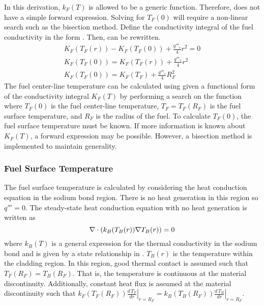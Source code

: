       In this derivation, $k_F(T)$ is allowed to be a generic function. 
      Therefore,  does not have a simple forward 
      expression. Solving for $T_F(0)$ will require a non-linear search such as
      the bisection method. Define the conductivity integral of the fuel
      conductivity in the form .
      Then,  can be rewritten.
      \begin{gather}
        K_F(T_F(r)) - K_F(T_F(0)) + \frac{q'''_c}{4} r^2 = 0 \\
        K_F(T_F(0)) = K_F(T_F(r)) + \frac{q'''_c}{4} r^2 \\
        \label{eq:tcl_conductivity_integral}
        K_F(T_F(0)) = K_F(T_F) + \frac{q'''_c}{4} R_F^2
      \end{gather}
      The fuel center-line temperature can be calculated using
       given a functional form of the
      conductivity integral $K_F(T)$ by performing a search on the function
      where $T_F(0)$ is the fuel center-line temperature, $T_F=T_F(R_F)$ is the
      fuel surface temperature, and $R_F$ is the radius of the fuel. To
      calculate $T_F(0)$, the fuel surface temperature must be known.
      If more information is known about $K_F(T)$, a forward expression
      may be possible. However, a bisection method is implemented to maintain
      generality.

    \subsubsection{Fuel Surface Temperature}
      The fuel surface temperature is calculated by considering the heat
      conduction equation in the sodium bond region. There is no heat generation
      in this region so $q'''=0$.
      The steady-state heat conduction equation with no heat generation is
      written as
      \begin{equation}
        \label{eq:tc_grad}
        \mathbf{\nabla} \cdot (k_B(T_B(r)) \mathbf{\nabla} T_B(r)) = 0
      \end{equation}
      where $k_B(T)$ is a general expression for the thermal conductivity in the
      sodium bond and is given by a state relationship in \cite{sodiumProp}.
      $T_B(r)$ is the temperature within the cladding region.
      In this region, good thermal contact is
      assumed such that $T_F(R_F)=T_B(R_F)$. That is, the temperature is 
      continuous at the material discontinuity. Additionally, constant heat flux
      is assumed at the material discontinuity such that $k_F(T_F(R_F))
      \left.\frac{d\,T_F}{dr}\right|_{r=R_F} = k_B(T_B(R_F))
      \left.\frac{d\,T_B}{dr}\right|_{r=R_F}$.

